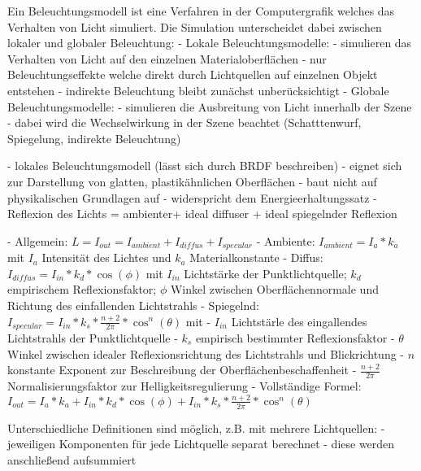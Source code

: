 \documentclass[10pt,landscape]{article}
\makeatletter
\renewcommand{\subsection}{\@startsection{subsection}{2}{0mm}%
                                {-1explus -.5ex minus -.2ex}%
                                {0.5ex plus .2ex}%
                                {\normalfont\normalsize\bfseries}}
\makeatother
\begin{document}
\begin{multicols}{3}
  
  Ein Beleuchtungsmodell ist eine Verfahren in der Computergrafik welches das Verhalten von Licht simuliert. Die Simulation unterscheidet dabei zwischen lokaler und globaler Beleuchtung:
  - Lokale Beleuchtungsmodelle:
  - simulieren das Verhalten von Licht auf den einzelnen Materialoberflächen
  - nur Beleuchtungseffekte welche direkt durch Lichtquellen auf einzelnen Objekt entstehen
  - indirekte Beleuchtung bleibt zunächst unberücksichtigt
  - Globale Beleuchtungsmodelle:
  - simulieren die Ausbreitung von Licht innerhalb der Szene
  - dabei wird die Wechselwirkung in der Szene beachtet (Schatttenwurf, Spiegelung, indirekte Beleuchtung)
  
  - lokales Beleuchtungsmodell (lässt sich durch BRDF beschreiben)
  - eignet sich zur Darstellung von glatten, plastikähnlichen Oberflächen
  - baut nicht auf physikalischen Grundlagen auf
  - widerspricht dem Energieerhaltungssatz
  - Reflexion des Lichts = ambienter+ ideal diffuser + ideal spiegelnder Reflexion
  
  
  - Allgemein: $L=I_{out}=I_{ambient}+I_{diffus}+I_{specular}$
  - Ambiente: $I_{ambient}=I_a * k_a$ mit $I_a$ Intensität des Lichtes und $k_a$ Materialkonstante
  - Diffus: $I_{diffus}=I_{in}*k_d*\cos(\phi)$ mit $I_{in}$ Lichtstärke der Punktlichtquelle; $k_d$ empirischem Reflexionsfaktor; $\phi$ Winkel zwischen Oberflächennormale und Richtung des einfallenden Lichtstrahls
  - Spiegelnd: $I_{specular}=I_{in}*k_s*\frac{n+2}{2\pi}*\cos^n({\theta})$ mit
  - $I_{in}$ Lichtstärle des eingallendes Lichtstrahls der Punktlichtquelle
  - $k_s$ empirisch bestimmter Reflexionsfaktor
  - $\theta$ Winkel zwischen idealer Reflexionsrichtung des Lichtstrahls und Blickrichtung
  - $n$ konstante Exponent zur Beschreibung der Oberflächenbeschaffenheit
  - $\frac{n+2}{2\pi}$ Normalisierungsfaktor zur Helligkeitsregulierung
  - Vollständige Formel: $I_{out}=I_a*k_a+I_{in}*k_d*\cos(\phi)+I_{in}*k_s*\frac{n+2}{2\pi}*\cos^n(\theta)$
  
  Unterschiedliche Definitionen sind möglich, z.B. mit mehrere Lichtquellen:
  - jeweiligen Komponenten für jede Lichtquelle separat berechnet
  - diese werden anschließend aufsummiert
  

\end{multicols}
\end{document}
